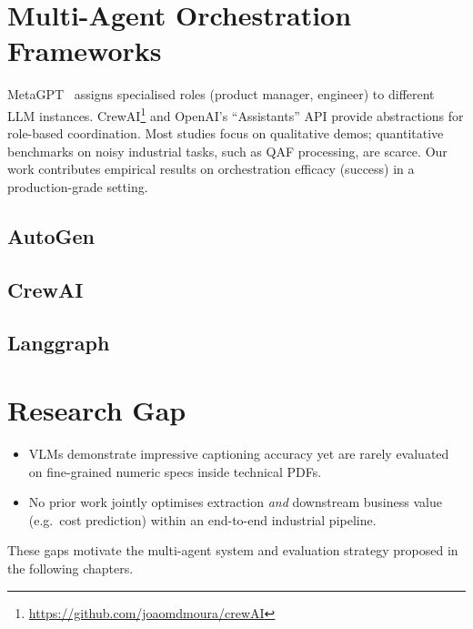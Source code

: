 \section{Multi-Agent Orchestration Frameworks}
MetaGPT~\cite{hong2023metagpt} assigns specialised roles (product manager, engineer) to different LLM instances.  
CrewAI\footnote{\url{https://github.com/joaomdmoura/crewAI}} and OpenAI’s “Assistants” API provide abstractions for role-based coordination.  
Most studies focus on qualitative demos; quantitative benchmarks on noisy industrial tasks, such as QAF processing, are scarce.  
Our work contributes empirical results on orchestration efficacy (success) in a production-grade setting.

\subsection{AutoGen}
\subsection{CrewAI}
\subsection{Langgraph}
\section{Research Gap}
\begin{itemize}
  \item VLMs demonstrate impressive captioning accuracy yet are rarely evaluated on fine-grained numeric specs inside technical PDFs.
  \item No prior work jointly optimises extraction \emph{and} downstream business value (e.g.\ cost prediction) within an end-to-end industrial pipeline.
\end{itemize}
These gaps motivate the multi-agent system and evaluation strategy proposed in the following chapters.
